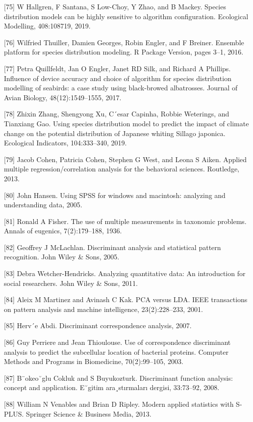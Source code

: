 \documentclass[preprint,12pt]{elsarticle}
\begin{document}
[75] W Hallgren, F Santana, S Low-Choy, Y Zhao, and B Mackey. Species distribution models can be highly sensitive to algorithm configuration. Ecological Modelling, 408:108719, 2019. 

[76] Wilfried Thuiller, Damien Georges, Robin Engler, and F Breiner. Ensemble platform for species distribution modeling. R Package Version, pages 3–1, 2016. 

[77] Petra Quillfeldt, Jan O Engler, Janet RD Silk, and Richard A Phillips. Influence of device accuracy and choice of algorithm for species distribution modelling of seabirds: a case study using black-browed albatrosses. Journal of Avian Biology, 48(12):1549–1555, 2017. 

[78] Zhixin Zhang, Shengyong Xu, C´esar Capinha, Robbie Weterings, and Tianxiang Gao. Using species distribution model to predict the impact of climate change on the potential distribution of Japanese whiting Sillago japonica. Ecological Indicators, 104:333–340, 2019. 

[79] Jacob Cohen, Patricia Cohen, Stephen G West, and Leona S Aiken. Applied multiple regression/correlation analysis for the behavioral sciences. Routledge, 2013. 

[80] John Hansen. Using SPSS for windows and macintosh: analyzing and understanding data, 2005. 

[81] Ronald A Fisher. The use of multiple measurements in taxonomic problems. Annals of eugenics, 7(2):179–188, 1936. 

[82] Geoffrey J McLachlan. Discriminant analysis and statistical pattern recognition. John Wiley & Sons, 2005. 

[83] Debra Wetcher-Hendricks. Analyzing quantitative data: An introduction for social researchers. John Wiley & Sons, 2011. 

[84] Aleix M Martinez and Avinash C Kak. PCA versus LDA. IEEE transactions on pattern analysis and machine intelligence, 23(2):228–233, 2001. 

[85] Herv´e Abdi. Discriminant correspondence analysis, 2007. 

[86] Guy Perriere and Jean Thioulouse. Use of correspondence discriminant analysis to predict the subcellular location of bacterial proteins. Computer Methods and Programs in Biomedicine, 70(2):99–105, 2003. 

[87] B¨okeo˘glu Cokluk and S Buyukozturk. Discriminant function analysis: concept and application. E˘gitim ara¸stırmaları dergisi, 33:73–92, 2008. 

[88] William N Venables and Brian D Ripley. Modern applied statistics with S-PLUS. Springer Science & Business Media, 2013. 
\end{document}
